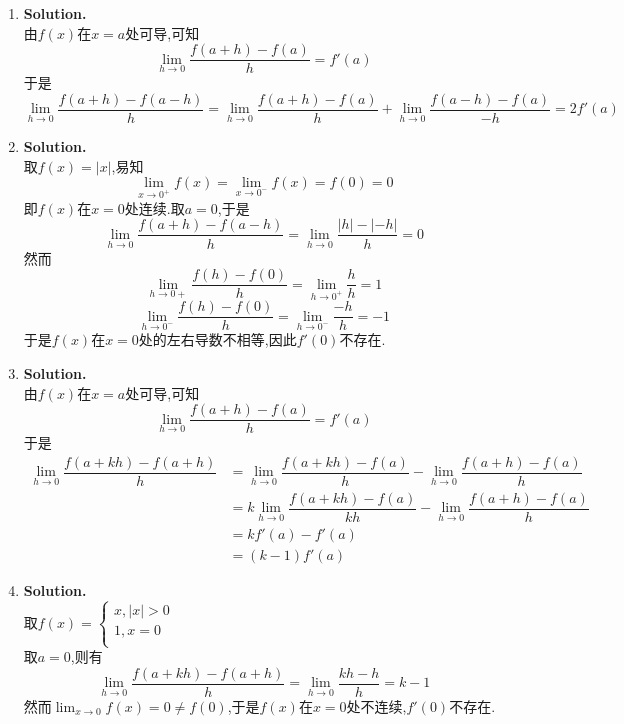 \documentclass{ctexart}
\begin{document}
\begin{solution}
    \begin{enumerate}[label=\textbf{(\arabic*)}]
        \item \textbf{Solution.}\\
            由$f(x)$在$x=a$处可导,可知$$\lim_{h\to 0}\dfrac{f(a+h)-f(a)}{h}=f'(a)$$
            于是$$\lim_{h\to0}\dfrac{f(a+h)-f(a-h)}{h}=\lim_{h\to 0}\dfrac{f(a+h)-f(a)}{h}+\lim_{h\to 0}\dfrac{f(a-h)-f(a)}{-h}=2f'(a)$$
        \item \textbf{Solution.}\\
            取$f(x)=\left|x\right|$,易知$$\lim_{x\to0^+}f(x)=\lim_{x\to0^-}f(x)=f(0)=0$$
            即$f(x)$在$x=0$处连续.取$a=0$,于是
            $$\lim_{h\to0}\dfrac{f(a+h)-f(a-h)}{h}=\lim_{h\to 0}\dfrac{\left|h\right|-\left|-h\right|}{h}=0$$
            然而$$\lim_{h\to 0+}\dfrac{f(h)-f(0)}{h}=\lim_{h\to0^+}\dfrac{h}{h}=1$$
            $$\lim_{h\to0^-}\dfrac{f(h)-f(0)}{h}=\lim_{h\to0^-}\dfrac{-h}{h}=-1$$
            于是$f(x)$在$x=0$处的左右导数不相等,因此$f'(0)$不存在.
        \item \textbf{Solution.}\\
            由$f(x)$在$x=a$处可导,可知$$\lim_{h\to 0}\dfrac{f(a+h)-f(a)}{h}=f'(a)$$
            于是
            $$\begin{aligned}
                \lim_{h\to0}\dfrac{f(a+kh)-f(a+h)}{h}
                &= \lim_{h\to0}\dfrac{f(a+kh)-f(a)}{h}-\lim_{h\to0}\dfrac{f(a+h)-f(a)}{h} \\
                &= k\lim_{h\to0}\dfrac{f(a+kh)-f(a)}{kh}-\lim_{h\to0}\dfrac{f(a+h)-f(a)}{h} \\
                &= kf'(a)-f'(a) \\
                &= (k-1)f'(a)
            \end{aligned}$$
        \item \textbf{Solution.}\\
            取$\displaystyle f(x)=\left\{\begin{array}{l}
                x,\left|x\right|>0 \\
                1,x=0 \\
            \end{array}\right.$\\
            取$a=0$,则有$$\lim_{h\to0}\dfrac{f(a+kh)-f(a+h)}{h}=\lim_{h\to0}\dfrac{kh-h}{h}=k-1$$
            然而$\displaystyle\lim_{x\to 0}f(x)=0\neq f(0)$,于是$f(x)$在$x=0$处不连续,$f'(0)$不存在.
    \end{enumerate}
\end{solution}
\end{document}
